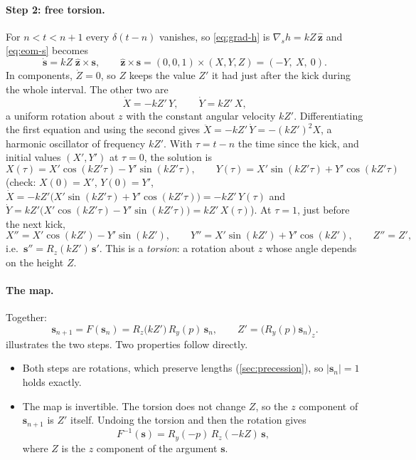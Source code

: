 \documentclass[11pt,a4paper]{article}
\newcommand{\vs}{\bm{s}}
\begin{document}
\paragraph{Step 2: free torsion.} For $n < t < n+1$ every $\delta(t-n)$ vanishes, so \eqref{eq:grad-h} is
$\nabla_{\!s} h = kZ\,\hat{\bm z}$ and \eqref{eq:eom-s} becomes
\begin{equation}\label{eq:torsion-ode}
  \dot{\vs} = kZ\;\hat{\bm z}\times\vs, \qquad \hat{\bm z}\times\vs = (0,0,1)\times(X,Y,Z) = (-Y,\ X,\ 0).
\end{equation}
In components, $\dot Z = 0$, so $Z$ keeps the value $Z'$ it had just after the kick during the whole interval. The
other two are
\begin{equation*}
  \dot X = -kZ'\,Y, \qquad \dot Y = kZ'\,X ,
\end{equation*}
a uniform rotation about $z$ with the constant angular velocity $kZ'$. Differentiating the first equation and using
the second gives $\ddot X = -kZ'\,\dot Y = -(kZ')^2X$, a harmonic oscillator of frequency $kZ'$. With $\tau = t - n$
the time since the kick, and initial values $(X', Y')$ at $\tau = 0$, the solution is
\begin{equation*}
  X(\tau) = X'\cos(kZ'\tau) - Y'\sin(kZ'\tau), \qquad Y(\tau) = X'\sin(kZ'\tau) + Y'\cos(kZ'\tau)
\end{equation*}
(check: $X(0) = X'$, $Y(0) = Y'$, $\dot X = -kZ'\big(X'\sin(kZ'\tau) + Y'\cos(kZ'\tau)\big) = -kZ'\,Y(\tau)$ and
$\dot Y = kZ'\big(X'\cos(kZ'\tau) - Y'\sin(kZ'\tau)\big) = kZ'\,X(\tau)$). At $\tau = 1$, just before the next kick,
\begin{equation}\label{eq:torsion}
  X'' = X'\cos(kZ') - Y'\sin(kZ'), \qquad Y'' = X'\sin(kZ') + Y'\cos(kZ'), \qquad Z'' = Z' ,
\end{equation}
i.e.\ $\vs'' = R_z(kZ')\,\vs'$. This is a \emph{torsion}: a rotation about $z$ whose angle depends on the height $Z$.

\paragraph{The map.} Together:
\begin{equation}\label{eq:map}
  \boxed{\vs_{n+1} = F(\vs_n) = R_z\!\big(k Z'\big)\, R_y(p)\, \vs_n , \qquad Z' = \big(R_y(p)\vs_n\big)_z .}
\end{equation}
 illustrates the two steps. Two properties follow directly.
\begin{itemize}
  \item Both steps are rotations, which preserve lengths (\cref{sec:precession}), so $|\vs_n| = 1$ holds exactly.
  \item The map is invertible. The torsion does not change $Z$, so the $z$ component of $\vs_{n+1}$ is $Z'$
  itself. Undoing the torsion and then the rotation gives
  \begin{equation*}
    F^{-1}(\vs) = R_y(-p)\,R_z(-kZ)\,\vs ,
  \end{equation*}
  where $Z$ is the $z$ component of the argument $\vs$.
\end{itemize}
\end{document}
